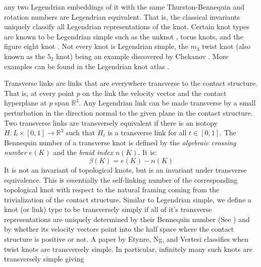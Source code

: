 \documentclass{article}
\theoremstyle{plain}
\begin{document}
        any two Legendrian embeddings of it with the same Thurston-Bennequin
        and rotation numbers are Legendrian equivalent. That is, the classical
        invariants uniquely classify all Legendrian representations of the knot.
        Certain knot types are known to be Legendrian simple such as the unknot
        \cite{EliashbergFraserClassificationTopTrivialLegKnots}, torus knots,
        and the figure eight knot \cite{EtnyreHondaContactTopologyI}.
        Not every knot is Legendrian simple, the $m_{3}$ twist knot (also
        known as the $5_{2}$ knot) being an example discovered by Chekanov
        \cite{ChekanovDifAlgOfLegLinks}. More examples can be found in the
        Legendrian knot atlas \cite{LegendrianKnotAtlas}.
        \par\hfill\par
        Transverse links are links that are everywhere transverse to the
        contact structure. That is, at every point $p$ on the link the velocity
        vector and the contact hyperplane at $p$ span $\mathbb{R}^{3}$. Any Legendrian
        link can be made transverse by a small perturbation in the direction
        normal to the given plane in the contact structure.
        Two transverse links are transversely equivalent if there is an
        isotopy $H:L\times[0,1]\rightarrow\mathbb{R}^{3}$ such that $H_{t}$ is a
        transverse link for all $t\in[0,1]$. The Bennequin number of a
        transverse knot is defined by the \textit{algebraic crossing number}
        $e(K)$ and the \textit{braid index} $n(K)$. It is:
        \begin{equation}
            \beta(K)=e(K)-n(K)
        \end{equation}
        It is not an invariant of topological knots, but is an invariant under
        transverse equivalence. This is essentially the self-linking number of
        the corresponding topological knot with respect to the natural framing
        coming from the trivialization of the contact structure.
        Similar to Legendrian simple, we define a knot
        (or link) type to be transversely simply if all of it's transverse
        representations are uniquely determined by their Bennequin number
        (See \cite{BirmanWrinkleTransversallySimpleKnots}) and by whether its
        velocity vectors point into the half space where the contact structure
        is positive or not. A paper by Etynre, Ng, and Vertesi
        \cite{EtnyreEtAlLegendrianAndTransverseTwistKnots}
        classifies when twist knots are transversely simple. In
        particular, infinitely many such knots are transversely simple giving
\end{document}
